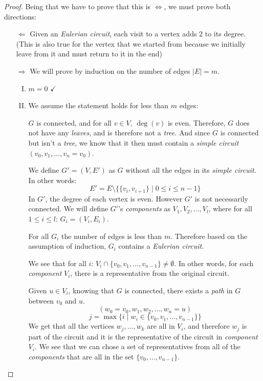 \documentclass[00_complete]{subfiles}
\begin{document}
\begin{proof}
    Being that we have to prove that this is $\iff$, we must prove both directions:
    \begin{enumerate}
        \item[$\Leftarrow$] Given an \emph{Eulerian circuit}, each visit to a
            vertex adds $2$ to its degree. (This is also true for the vertex
            that we started from because we initially leave from it and must
            return to it in the end)

        \item[$\Rightarrow$] We will prove by induction on the number of edges
            $|E|=m$.
            \begin{enumerate}[I.]
               \item $m=0$ $\checkmark$
               \item We assume the statement holds for less than $m$ edges:

            $G$ is connected, and for all $v \in V$, $\deg(v)$
            is even. Therefore, $G$ does not have any \emph{leaves}, and is
            therefore not a \emph{tree}. And since $G$ is connected but isn't a
            \emph{tree}, we know that it then must contain a \emph{simple
            circuit} $(v_0,v_1,\dots,v_n=v_0)$.

            We define $G'=(V,E')$ as $G$ without all the edges in its
            \emph{simple circuit}. In other words:
            $$E'=E \setminus \{\{v_i,v_{i+1}\} \mid 0 \leq i \leq n-1\}$$
            In $G'$, the degree of each vertex is even. However $G'$ is not
            necessarily connected. We will define $G'$'s \emph{components} as
            $V_1,V_2,\dots,V_l$, where for all $1 \leq i \leq l$: $G_i=(V_i,E_i)$.

            For all $G_i$ the number of edges is less than $m$. Therefore based
            on the assumption of induction, $G_i$ contains a \emph{Eulerian
            circuit}.

            We see that for all $i$: $V_i\cap\{v_0,v_1,\dots,v_{n-1}\}\neq
            \emptyset$. In other words, for each \emph{component} $V_i$, there
            is a representative from the original circuit.

            Given $u \in V_i$, knowing that $G$ is connected, there exists a
            \emph{path} in $G$ between $v_0$ and $u$.
            $$(w_0=v_0,w_1,w_2,\dots,w_n=u)$$
            $$j=\max\{i\mid w_i \in \{v_0,v_1,\dots,v_{n-1}\}\}$$
            We get that all the vertices $w_j,\dots,w_k$ are all in $V_i$, and
            therefore $w_j$ is part of the circuit and it is the representative
            of the circuit in \emph{component} $V_i$.
            We see that we can chose a set of representatives from all of the
            \emph{components} that are all in the set $\{v_0,\dots,v_{n-1}\}$.


\end{enumerate}
\end{enumerate}
\end{proof}
\end{document}
